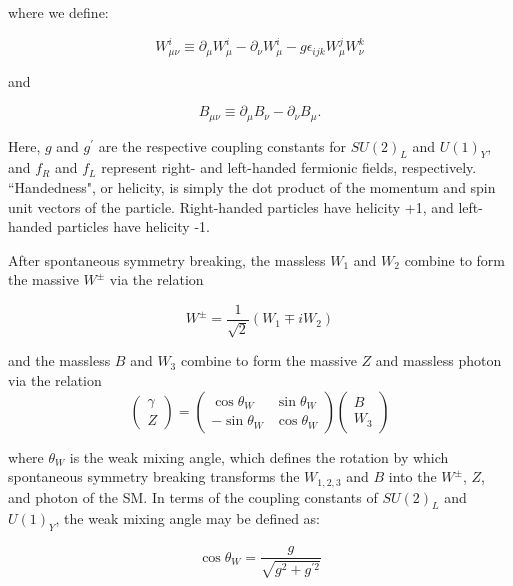 where we define:

\begin{equation}
W^{i}_{\mu\nu} \equiv \partial_{\mu}W^{i}_{\mu} - \partial_{\nu}W^{i}_{\mu} - g\epsilon_{ijk}W^{j}_{\mu}W^{k}_{\nu}
\end{equation}

and

\begin{equation}
B_{\mu\nu} \equiv \partial_{\mu}B_{\nu} - \partial_{\nu}B_{\mu}.
\end{equation}

Here, $g$ and $g^{\prime}$ are the respective coupling constants for $SU(2)_{L}$ and $U(1)_{Y}$, and $f_{R}$ and $f_{L}$ represent right- and left-handed fermionic fields, respectively. ``Handedness", or helicity, is simply the dot product of the momentum and spin unit vectors of the particle. Right-handed particles have helicity +1, and left-handed particles have helicity -1.

After spontaneous symmetry breaking, the massless $W_{1}$ and $W_{2}$ combine to form the massive $W^{\pm}$ via the relation

\begin{equation}
W^{\pm} = \frac{1}{\sqrt{2}}\left(W_{1} \mp iW_{2}\right)
\end{equation}

and the massless $B$ and $W_{3}$ combine to form the massive $Z$ and massless photon via the relation
\begin{equation}
\begin{pmatrix}\gamma \\Z\end{pmatrix}=\begin{pmatrix}\cos \theta _{W}&\sin \theta _{W}\\-\sin \theta _{W}&\cos \theta _{W}\end{pmatrix}\begin{pmatrix}B\\W_{3}\end{pmatrix}
\end{equation}

where $\theta_{W}$ is the weak mixing angle, which defines the rotation by which spontaneous symmetry breaking transforms the $W_{1,2,3}$ and $B$ into the $W^{\pm}$, $Z$, and photon of the SM. In terms of the coupling constants of $SU(2)_{L}$ and $U(1)_{Y}$, the weak mixing angle may be defined as:

\begin{equation}
\cos \theta_{W} = \frac{g}{\sqrt{g^{2} + g^{\prime2}}}
\end{equation}

